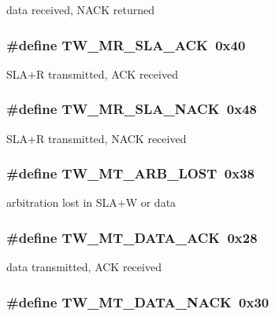 \label{group__util__twi_ga532f0ffa12f684346c74a5cbec15950e}
data received, NACK returned \hypertarget{group__util__twi_gac16504b87d15d83b97bb0ce61577bb40}{
\subsubsection[{TW\_\-MR\_\-SLA\_\-ACK}]{\setlength{\rightskip}{0pt plus 5cm}\#define TW\_\-MR\_\-SLA\_\-ACK~0x40}}
\label{group__util__twi_gac16504b87d15d83b97bb0ce61577bb40}
SLA+R transmitted, ACK received \hypertarget{group__util__twi_ga655325b6f8a1818103b126cc3774d8e8}{
\subsubsection[{TW\_\-MR\_\-SLA\_\-NACK}]{\setlength{\rightskip}{0pt plus 5cm}\#define TW\_\-MR\_\-SLA\_\-NACK~0x48}}
\label{group__util__twi_ga655325b6f8a1818103b126cc3774d8e8}
SLA+R transmitted, NACK received \hypertarget{group__util__twi_ga5959251c4bd80f48b5a029447d86adb3}{
\subsubsection[{TW\_\-MT\_\-ARB\_\-LOST}]{\setlength{\rightskip}{0pt plus 5cm}\#define TW\_\-MT\_\-ARB\_\-LOST~0x38}}
\label{group__util__twi_ga5959251c4bd80f48b5a029447d86adb3}
arbitration lost in SLA+W or data \hypertarget{group__util__twi_ga4c28186053b5298305b131ad3e1111f7}{
\subsubsection[{TW\_\-MT\_\-DATA\_\-ACK}]{\setlength{\rightskip}{0pt plus 5cm}\#define TW\_\-MT\_\-DATA\_\-ACK~0x28}}
\label{group__util__twi_ga4c28186053b5298305b131ad3e1111f7}
data transmitted, ACK received \hypertarget{group__util__twi_ga91c107a74d268f8578d866ed1bbbd4f3}{
\subsubsection[{TW\_\-MT\_\-DATA\_\-NACK}]{\setlength{\rightskip}{0pt plus 5cm}\#define TW\_\-MT\_\-DATA\_\-NACK~0x30}}
